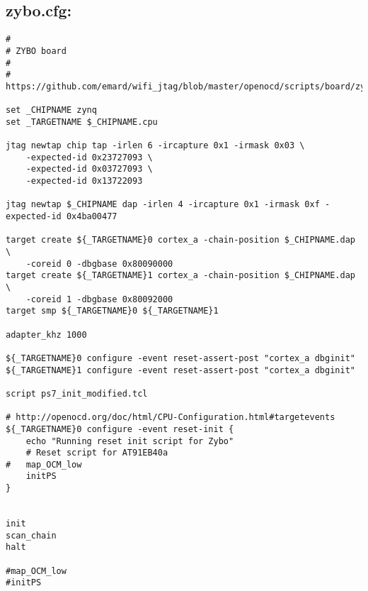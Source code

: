 \subsection{zybo.cfg:}
\label{anhang:zybo.cfg}
\lstset{language=tcl}
\begin{lstlisting}
#
# ZYBO board
#
# https://github.com/emard/wifi_jtag/blob/master/openocd/scripts/board/zybo.cfg 

set _CHIPNAME zynq
set _TARGETNAME $_CHIPNAME.cpu

jtag newtap chip tap -irlen 6 -ircapture 0x1 -irmask 0x03 \
    -expected-id 0x23727093 \
    -expected-id 0x03727093 \
    -expected-id 0x13722093

jtag newtap $_CHIPNAME dap -irlen 4 -ircapture 0x1 -irmask 0xf -expected-id 0x4ba00477

target create ${_TARGETNAME}0 cortex_a -chain-position $_CHIPNAME.dap \
    -coreid 0 -dbgbase 0x80090000
target create ${_TARGETNAME}1 cortex_a -chain-position $_CHIPNAME.dap \
    -coreid 1 -dbgbase 0x80092000
target smp ${_TARGETNAME}0 ${_TARGETNAME}1

adapter_khz 1000

${_TARGETNAME}0 configure -event reset-assert-post "cortex_a dbginit"
${_TARGETNAME}1 configure -event reset-assert-post "cortex_a dbginit"

script ps7_init_modified.tcl

# http://openocd.org/doc/html/CPU-Configuration.html#targetevents
${_TARGETNAME}0 configure -event reset-init {
	echo "Running reset init script for Zybo"
	# Reset script for AT91EB40a
#	map_OCM_low
	initPS
}


init
scan_chain
halt

#map_OCM_low
#initPS
\end{lstlisting}





